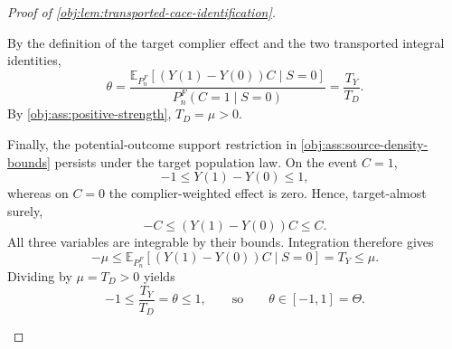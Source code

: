 \begin{proof}[Proof of \cref{obj:lem:transported-cace-identification}]
\begin{enumerate}
By the definition of the target complier effect and the two transported integral identities,
\[
\theta
=
\frac{\mathbb E_{P_n^F}[(Y(1)-Y(0))C\mid S=0]}
     {P_n^F(C=1\mid S=0)}
=
\frac{T_Y}{T_D}.
\]
By \cref{obj:ass:positive-strength}, \(T_D=\mu>0\).

Finally, the potential-outcome support restriction in
\cref{obj:ass:source-density-bounds} persists under the target population law. On the event \(C=1\),
\[
-1\le Y(1)-Y(0)\le1,
\]
whereas on \(C=0\) the complier-weighted effect is zero. Hence, target-almost surely,
\[
-C\le (Y(1)-Y(0))C\le C.
\]
All three variables are integrable by their bounds. Integration therefore gives
\[
-\mu
\le\mathbb E_{P_n^F}[(Y(1)-Y(0))C\mid S=0]
=T_Y
\le\mu.
\]
Dividing by \(\mu=T_D>0\) yields
\[
-1\le\frac{T_Y}{T_D}=\theta\le1,
\qquad\text{so}\qquad
\theta\in[-1,1]=\Theta.
\]
\end{enumerate}
\end{proof}
